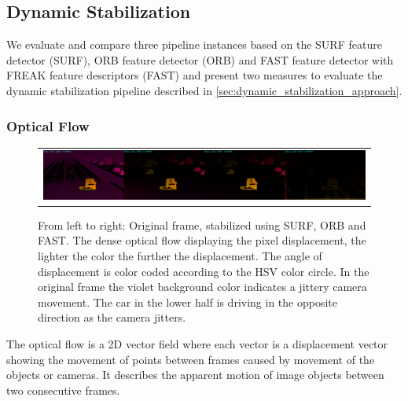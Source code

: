 \subsection{Dynamic Stabilization}
\label{sec:evaluation_dynamic_stabilization}
We evaluate and compare three pipeline instances based on the SURF \cite{bay10.1007/11744023_32,opencv_library} feature detector (SURF), 
ORB \cite{rublee6126544, opencv_library} feature detector (ORB) and FAST \cite{Ghahremani_2021,opencv_library} feature detector with FREAK \cite{alahi6247715,opencv_library} feature descriptors (FAST) 
and present two measures to evaluate the dynamic stabilization pipeline described in \autoref{sec:dynamic_stabilization_approach}.


\subsubsection{Optical Flow}
\begin{figure}[!ht]
    \centering
    \begin{tabular}{c}
      \includegraphics[width=0.95\linewidth]{images/frame_1317_cropped.png}    
    \end{tabular}
    \caption{
        From left to right: Original frame, stabilized using SURF, ORB and FAST.
        The dense optical flow displaying the pixel displacement, the lighter the color the further the displacement. 
        The angle of displacement is color coded according to the HSV color circle.  
        In the original frame the violet background color indicates a jittery camera movement. 
        The car in the lower half is driving in the opposite direction as the camera jitters. 
    }
    \label{fig:optical_flow_example}
\end{figure}

The optical flow is a 2D vector field where each vector is a displacement vector showing the movement of points between frames caused by movement of the objects or cameras.
It describes the apparent motion of image objects between two consecutive frames. 

